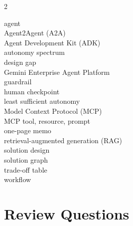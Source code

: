 \begin{multicols}{2}
\raggedright\small
agent \\
Agent2Agent (A2A) \\
Agent Development Kit (ADK) \\
autonomy spectrum \\
design gap \\
Gemini Enterprise Agent Platform \\
guardrail \\
human checkpoint \\
least sufficient autonomy \\
Model Context Protocol (MCP) \\
MCP tool, resource, prompt \\
one-page memo \\
retrieval-augmented generation (RAG) \\
solution design \\
solution graph \\
trade-off table \\
workflow
\end{multicols}

\section*{Review Questions}

